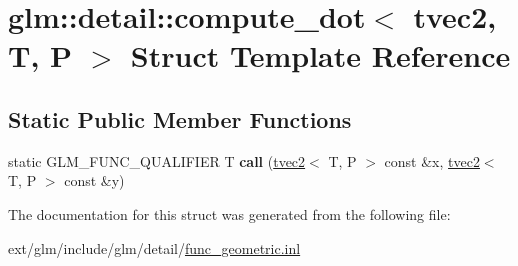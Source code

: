 \hypertarget{structglm_1_1detail_1_1compute__dot_3_01tvec2_00_01_t_00_01_p_01_4}{\section{glm\-:\-:detail\-:\-:compute\-\_\-dot$<$ tvec2, T, P $>$ Struct Template Reference}
\label{structglm_1_1detail_1_1compute__dot_3_01tvec2_00_01_t_00_01_p_01_4}
}
\subsection*{Static Public Member Functions}
\begin{DoxyCompactItemize}
\item 
\hypertarget{structglm_1_1detail_1_1compute__dot_3_01tvec2_00_01_t_00_01_p_01_4_a351e36e5c7ed1bd74b9e1631c4fffc07}{static G\-L\-M\-\_\-\-F\-U\-N\-C\-\_\-\-Q\-U\-A\-L\-I\-F\-I\-E\-R T {\bfseries call} (\hyperlink{structglm_1_1tvec2}{tvec2}$<$ T, P $>$ const \&x, \hyperlink{structglm_1_1tvec2}{tvec2}$<$ T, P $>$ const \&y)}\label{structglm_1_1detail_1_1compute__dot_3_01tvec2_00_01_t_00_01_p_01_4_a351e36e5c7ed1bd74b9e1631c4fffc07}

\end{DoxyCompactItemize}


The documentation for this struct was generated from the following file\-:\begin{DoxyCompactItemize}
\item 
ext/glm/include/glm/detail/\hyperlink{func__geometric_8inl}{func\-\_\-geometric.\-inl}\end{DoxyCompactItemize}
